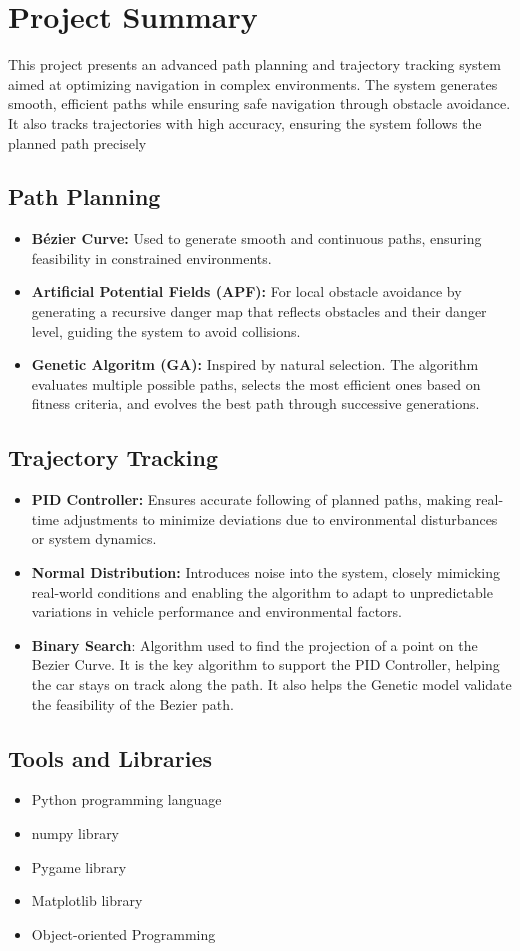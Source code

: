 \section{Project Summary}
This project presents an advanced path planning and trajectory tracking system aimed at optimizing navigation in complex environments. The system generates smooth, efficient paths while ensuring safe navigation through obstacle avoidance. It also tracks trajectories with high accuracy, ensuring the system follows the planned path precisely
  \subsection*{Path Planning}
  \begin{itemize}
    \item \textbf{Bézier Curve:} Used to generate smooth and continuous paths, ensuring feasibility in constrained environments.
    \item \textbf{Artificial Potential Fields (APF):} For local obstacle avoidance by generating a recursive danger map that reflects obstacles and their danger level, guiding the system to avoid collisions.
    \item \textbf{Genetic Algoritm (GA):}  Inspired by natural selection. The algorithm evaluates multiple possible paths, selects the most efficient ones based on fitness criteria, and evolves the best path through successive generations.
  \end{itemize}

  \subsection*{Trajectory Tracking}
  \begin{itemize}
    \item \textbf{PID Controller:} Ensures accurate following of planned paths, making real-time adjustments to minimize deviations due to environmental disturbances or system dynamics.
    \item \textbf{Normal Distribution:} Introduces noise into the system, closely mimicking real-world conditions and enabling the algorithm to adapt to unpredictable variations in vehicle performance and environmental factors.
    \item \textbf{Binary Search}: Algorithm used to find the projection of a point on the Bezier Curve.
      It is the key algorithm to support the PID Controller, helping the car stays on track along the path.
      It also helps the Genetic model validate the feasibility of the Bezier path.
  \end{itemize}
  \subsection*{Tools and Libraries}
  \begin{itemize}
    \item Python programming language
    \item numpy library
    \item Pygame library
    \item Matplotlib library
    \item Object-oriented Programming
  \end{itemize}


